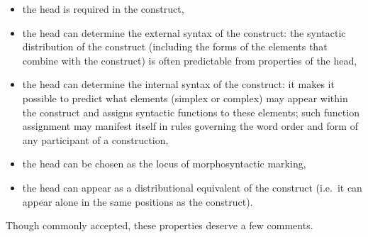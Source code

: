 \documentclass[output=paper
  ,nobabel
  ,draftmode
  ,colorlinks, citecolor=brown
]{langscibook}
\begin{document}
\begin{itemize}
    \item the head is required in the construct,\footnotemark
    \item the head can determine the external syntax of the construct: the syntactic distribution of the construct (including the forms of the elements that combine with the construct) is often predictable from properties of the head,
    \item the head can determine the internal syntax of the construct: it makes it possible to predict what elements (simplex or complex) may appear within the construct and assigns syntactic functions to these elements; such function assignment may manifest itself in rules governing the word order and form of any participant of a construction,
    \item the head can be chosen as the locus of morphosyntactic marking,
    \item the head can appear as a distributional equivalent of the construct (i.e.\ it can appear alone in the same positions as the construct).
\end{itemize}

\noindent
Though commonly accepted, these properties deserve a few comments. 
\end{document}

